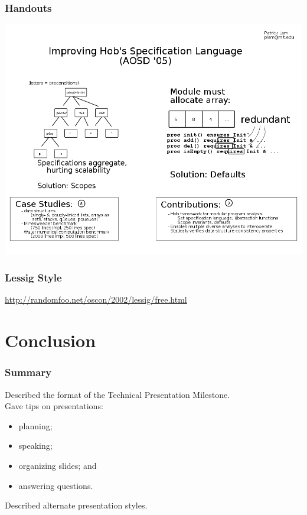 \documentclass{beamer}
\begin{document}
\begin{frame}
\frametitle{Handouts}

\begin{center}
\includegraphics[height=.8\textheight]{x-handout2}
\end{center}

\end{frame}

\begin{frame}
\frametitle{Lessig Style}

\small
\begin{center}
\url{http://randomfoo.net/oscon/2002/lessig/free.html}
\end{center}

\end{frame}

\section{Conclusion}

\begin{frame}
\frametitle{Summary}

Described the format of the Technical Presentation Milestone.\\[1em]

Gave tips on presentations:

\begin{itemize}
\item planning;
\item speaking;
\item organizing slides; and
\item answering questions.
\end{itemize}

Described alternate presentation styles.

\end{frame}
\end{document}

